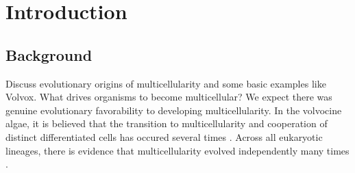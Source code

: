 
\chapter{Introduction} %

\ifpdf
    \graphicspath{{Chapter1/Figs/Raster/}{Chapter1/Figs/PDF/}{Chapter1/Figs/}}
\else
    \graphicspath{{Chapter1/Figs/Vector/}{Chapter1/Figs/}}
\fi


\section{Background} %

Discuss evolutionary origins of multicellularity and some basic examples like Volvox. What drives organisms to become multicellular? 
We expect there was genuine evolutionary favorability to developing multicellularity. 
In the volvocine algae, it is believed that the transition to multicellularity and cooperation of distinct differentiated cells has occured several times \citep{herron2008}. 
Across all eukaryotic lineages, there is evidence that multicellularity evolved independently many times \citep{king2004}.

